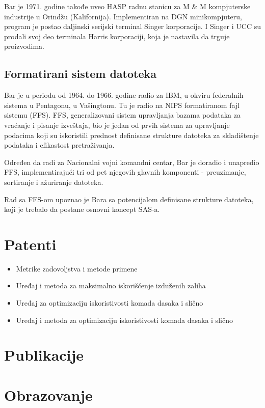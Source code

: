 \documentclass[a4paper]{article}
\begin{document}
{		Bar je 1971. godine takođe uveo HASP radnu stanicu za M \&  M kompjuterske industrije u Orindžu (Kalifornija). Implementiran na DGN minikompjuteru, program je postao daljinski serijski terminal Singer korporacije. I Singer i UCC su prodali svoj deo terminala Harris korporaciji, koja je nastavila da trguje proizvodima.
		
		\subsection{Formatirani sistem datoteka}
		Bar je u periodu od 1964. do 1966. godine radio za IBM, u okviru federalnih sistema u Pentagonu, u Vašingtonu. Tu je radio na NIPS formatiranom fajl sistemu (FFS). FFS, generalizovani sistem upravljanja bazama podataka za vraćanje i pisanje izveštaja, bio je jedan od prvih sistema za upravljanje podacima koji su iskoristili prednost definisane strukture datoteka za skladištenje podataka i efikastost pretraživanja.
		
		Određen da radi za Nacionalni vojni komandni centar, Bar je doradio i unapredio FFS, implementirajući tri od pet njegovih glavnih komponenti - preuzimanje, sortiranje i ažuriranje datoteka.
		
		Rad sa FFS-om upoznao je Bara sa potencijalom definisane strukture datoteka, koji je trebalo da postane osnovni koncept SAS-a.
		
		
		\newpage
		
		
		\section{Patenti}
		
		\begin{itemize}
			\item Metrike zadovoljstva i metode primene
			\item Uređaj i metoda za maksimalno iskorišćenje izduženih zaliha
			\item Uređaj za optimizaciju iskoristivosti komada dasaka i slično
			\item Uređaj i metoda za optimizaciju iskoristivosti komada dasaka i slično
		\end{itemize}
		
		\section{Publikacije}
		
		
		\newpage
		
		\section{Obrazovanje}
		
}
\end{document}
